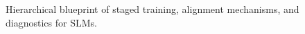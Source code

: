 \begin{figure}[ht]
    \centering
    \caption{Hierarchical blueprint of staged training, alignment mechanisms, and diagnostics for SLMs.}
    \label{fig:tree_figure_Train}
\end{figure}
